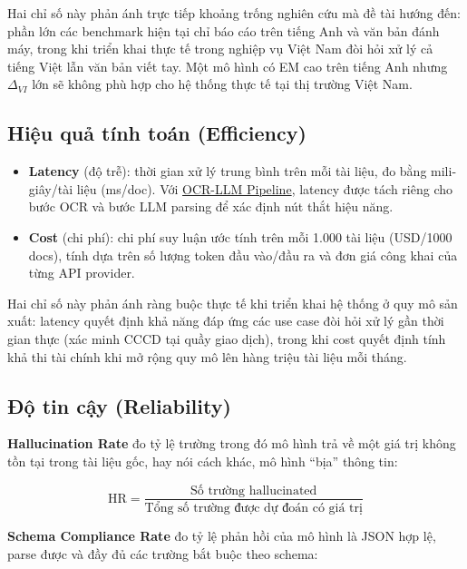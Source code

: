 ﻿\documentclass[12pt]{report}
\begin{document}
Hai chỉ số này phản ánh trực tiếp khoảng trống nghiên cứu mà đề tài hướng đến: phần lớn các benchmark hiện tại chỉ báo cáo trên tiếng Anh và văn bản đánh máy, trong khi triển khai thực tế trong nghiệp vụ Việt Nam đòi hỏi xử lý cả tiếng Việt lẫn văn bản viết tay. Một mô hình có EM cao trên tiếng Anh nhưng $\Delta_{VI}$ lớn sẽ không phù hợp cho hệ thống thực tế tại thị trường Việt Nam.

\subsection{Hiệu quả tính toán (Efficiency)}\label{sec:efficiency}

\begin{itemize}
    \item \textbf{Latency} (độ trễ): thời gian xử lý trung bình trên mỗi tài liệu, đo bằng mili-giây/tài liệu (ms/doc). Với \hyperref[sec:ocr_llm_pipeline]{OCR-LLM Pipeline}, latency được tách riêng cho bước OCR và bước LLM parsing để xác định nút thắt hiệu năng.
    \item \textbf{Cost} (chi phí): chi phí suy luận ước tính trên mỗi 1.000 tài liệu (USD/1000 docs), tính dựa trên số lượng token đầu vào/đầu ra và đơn giá công khai của từng API provider.
\end{itemize}

Hai chỉ số này phản ánh ràng buộc thực tế khi triển khai hệ thống ở quy mô sản xuất: latency quyết định khả năng đáp ứng các use case đòi hỏi xử lý gần thời gian thực (xác minh CCCD tại quầy giao dịch), trong khi cost quyết định tính khả thi tài chính khi mở rộng quy mô lên hàng triệu tài liệu mỗi tháng.

\subsection{Độ tin cậy (Reliability)}\label{sec:reliability}

\textbf{Hallucination Rate} \cite{hallucination2023survey} đo tỷ lệ trường trong đó mô hình trả về một giá trị không tồn tại trong tài liệu gốc, hay nói cách khác, mô hình ``bịa'' thông tin:

\begin{equation}
    \text{HR} = \frac{\text{Số trường hallucinated}}{\text{Tổng số trường được dự đoán có giá trị}}
\end{equation}

\textbf{Schema Compliance Rate} đo tỷ lệ phản hồi của mô hình là JSON hợp lệ, parse được và đầy đủ các trường bắt buộc theo schema:
\end{document}
